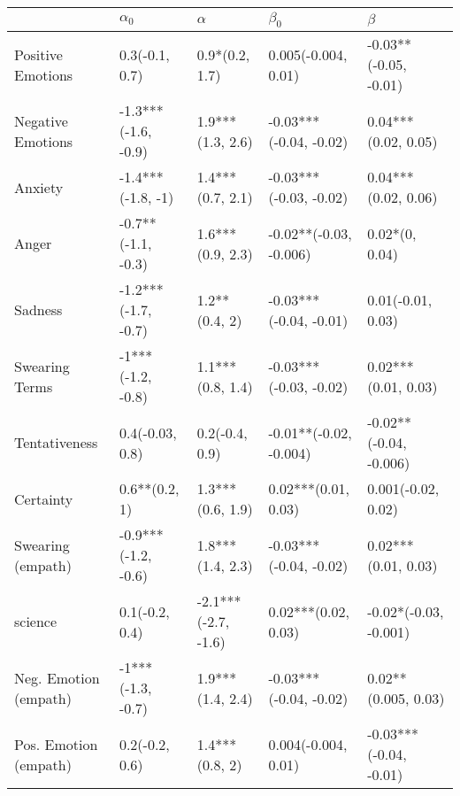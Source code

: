 \begin{tabular}{lllll}
\toprule
{} &           $\alpha_0$ &             $\alpha$ &               $\beta_0$ &                 $\beta$ \\
\midrule
Positive Emotions     &       0.3(-0.1, 0.7) &       0.9*(0.2, 1.7) &     0.005(-0.004, 0.01) &   -0.03**(-0.05, -0.01) \\
Negative Emotions     &  -1.3***(-1.6, -0.9) &     1.9***(1.3, 2.6) &  -0.03***(-0.04, -0.02) &     0.04***(0.02, 0.05) \\
Anxiety               &    -1.4***(-1.8, -1) &     1.4***(0.7, 2.1) &  -0.03***(-0.03, -0.02) &     0.04***(0.02, 0.06) \\
Anger                 &   -0.7**(-1.1, -0.3) &     1.6***(0.9, 2.3) &  -0.02**(-0.03, -0.006) &          0.02*(0, 0.04) \\
Sadness               &  -1.2***(-1.7, -0.7) &        1.2**(0.4, 2) &  -0.03***(-0.04, -0.01) &       0.01(-0.01, 0.03) \\
Swearing Terms        &    -1***(-1.2, -0.8) &     1.1***(0.8, 1.4) &  -0.03***(-0.03, -0.02) &     0.02***(0.01, 0.03) \\
Tentativeness         &      0.4(-0.03, 0.8) &       0.2(-0.4, 0.9) &  -0.01**(-0.02, -0.004) &  -0.02**(-0.04, -0.006) \\
Certainty             &        0.6**(0.2, 1) &     1.3***(0.6, 1.9) &     0.02***(0.01, 0.03) &      0.001(-0.02, 0.02) \\
Swearing (empath)     &  -0.9***(-1.2, -0.6) &     1.8***(1.4, 2.3) &  -0.03***(-0.04, -0.02) &     0.02***(0.01, 0.03) \\
science               &       0.1(-0.2, 0.4) &  -2.1***(-2.7, -1.6) &     0.02***(0.02, 0.03) &   -0.02*(-0.03, -0.001) \\
Neg. Emotion (empath) &    -1***(-1.3, -0.7) &     1.9***(1.4, 2.4) &  -0.03***(-0.04, -0.02) &     0.02**(0.005, 0.03) \\
Pos. Emotion (empath) &       0.2(-0.2, 0.6) &       1.4***(0.8, 2) &     0.004(-0.004, 0.01) &  -0.03***(-0.04, -0.01) \\
\bottomrule
\end{tabular}
